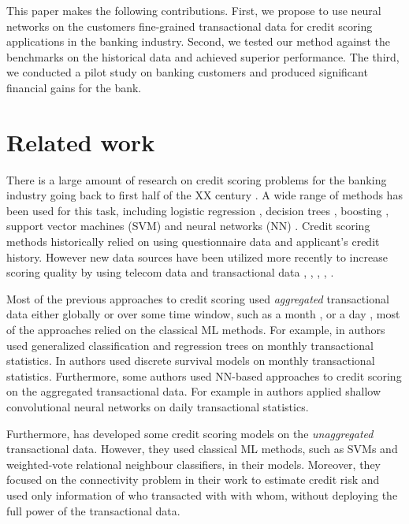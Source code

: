 \documentclass[sigconf]{acmart}
\begin{document}
This paper makes the following contributions.
First, we propose to use neural networks on the customers fine-grained transactional data for credit scoring applications in the banking industry.
Second, we tested our method against the benchmarks on the historical data and achieved superior performance.
The third, we conducted a pilot study on banking customers and produced significant financial gains for the bank.

\section{Related work} \label{sec-rw}

There is a large amount of research on credit scoring problems for the banking industry going back to first half of the XX century \cite{NBERc12952}. A wide range of methods has been used for this task, including logistic regression \cite{RePEc:cup:jfinqa:v:15:y:1980:i:03:p:757-770_00}, decision trees \cite{makowski1985credit}, boosting \cite{bastos2007credit}, support vector machines (SVM) \cite{HUANG2007847} and neural networks (NN) \cite{west2000neural}. Credit scoring methods historically relied on using questionnaire data and applicant's credit history. However new data sources have been utilized more recently to increase scoring quality by using telecom data \cite{bjorkegren2017behavior} and transactional data \cite{khandani2010consumer}, \cite{bellotti2013forecasting}, \cite{KVAMME2018207}, \cite{chi2012hybrid}, \cite{RePEc}.

Most of the previous approaches to credit scoring used {\em aggregated} transactional data either globally \cite{chi2012hybrid} or over some time window, such as a month \cite{khandani2010consumer}, \cite{bellotti2013forecasting} or a day \cite{KVAMME2018207}, most of the approaches relied on the classical ML methods. For example, in \cite{khandani2010consumer} authors used generalized classification and regression trees on monthly transactional statistics. In \cite{bellotti2013forecasting} authors used discrete survival models on monthly transactional statistics. Furthermore, some authors used NN-based approaches to credit scoring on the aggregated transactional data. For example in \cite{KVAMME2018207} authors applied shallow convolutional neural networks on daily transactional statistics. 

Furthermore, \cite{RePEc} has developed some credit scoring models on the {\em unaggregated} transactional data. However, they used classical ML methods, such as SVMs and weighted-vote relational neighbour classifiers, in their models. Moreover, they focused on the connectivity problem in their work to estimate credit risk and used only information of who transacted with with whom, without deploying the full power of the transactional data.
\end{document}
